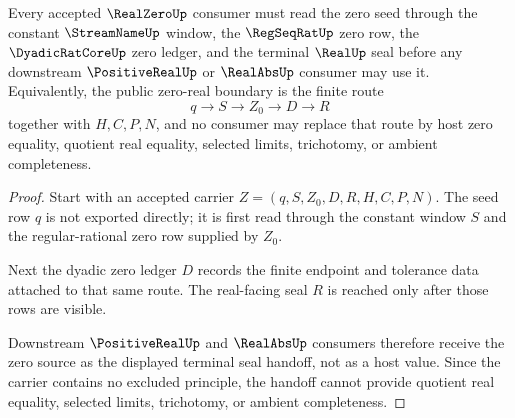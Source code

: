 \begin{theorem}
\label{thm:real-zero-terminal-seal-handoff}
Every accepted $\RealZeroUp$ consumer must read the zero seed through the constant $\StreamNameUp$ window, the $\RegSeqRatUp$ zero row, the $\DyadicRatCoreUp$ zero ledger, and the terminal $\RealUp$ seal before any downstream $\PositiveRealUp$ or $\RealAbsUp$ consumer may use it. Equivalently, the public zero-real boundary is the finite route
$$
q \longrightarrow S \longrightarrow Z_0 \longrightarrow D \longrightarrow R
$$
together with $H,C,P,N$, and no consumer may replace that route by host zero equality, quotient real equality, selected limits, trichotomy, or ambient completeness.
\end{theorem}
\begin{proof}
Start with an accepted carrier $Z=(q,S,Z_0,D,R,H,C,P,N)$. The seed row $q$ is not exported directly; it is first read through the constant window $S$ and the regular-rational zero row supplied by $Z_0$.

Next the dyadic zero ledger $D$ records the finite endpoint and tolerance data attached to that same route. The real-facing seal $R$ is reached only after those rows are visible.

Downstream $\PositiveRealUp$ and $\RealAbsUp$ consumers therefore receive the zero source as the displayed terminal seal handoff, not as a host value. Since the carrier contains no excluded principle, the handoff cannot provide quotient real equality, selected limits, trichotomy, or ambient completeness.
\end{proof}

